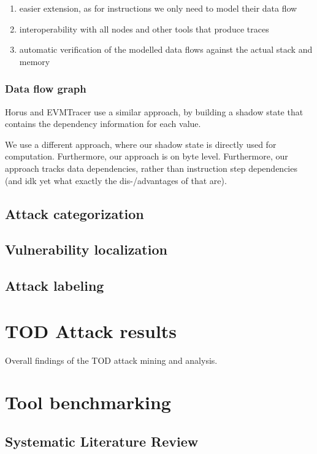 \documentclass[draft,final]{vutinfth} %
\begin{document}
    \begin{enumerate}
        \item easier extension, as for instructions we only need to model their data flow
        \item interoperability with all nodes and other tools that produce traces
        \item automatic verification of the modelled data flows against the actual stack and memory
    \end{enumerate}

    \subsection{Data flow graph}

    Horus and EVMTracer use a similar approach, by building a shadow state that contains the dependency information for each value.

    We use a different approach, where our shadow state is directly used for computation. Furthermore, our approach is on byte level. Furthermore, our approach tracks data dependencies, rather than instruction step dependencies (and idk yet what exactly the dis-/advantages of that are).

    \section{Attack categorization}

    \section{Vulnerability localization}

    \section{Attack labeling}
\fi
\chapter{TOD Attack results}

Overall findings of the TOD attack mining and analysis.

\chapter{Tool benchmarking}

\section{Systematic Literature Review}
\end{document}
